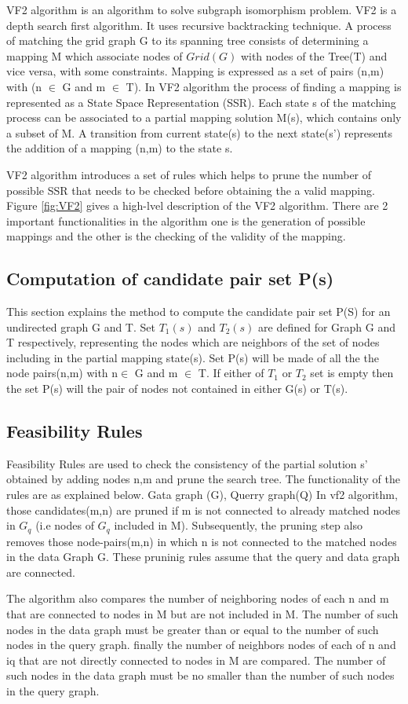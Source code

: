 VF2 algorithm is an algorithm to solve subgraph isomorphism problem. VF2 is a depth search first algorithm. It uses recursive backtracking technique. A process of matching 
the grid graph G to its spanning tree consists of determining a mapping M which associate nodes of $Grid(G)$ with nodes of the Tree(T) and vice versa, with some constraints.
Mapping is expressed as a set of pairs (n,m) with (n $\in$ G and m $\in$ T). 
In VF2 algorithm the process of finding a mapping is represented as a State Space Representation (SSR). Each state s of the matching process can be associated to a partial mapping solution M(s),
which contains only a subset of M. A transition from current state(s) to the next state(s') represents the addition of a mapping (n,m) to the state s.

VF2 algorithm introduces a set of rules which helps to prune the number of possible SSR that needs to be checked before obtaining the a valid mapping. Figure \ref{fig:VF2} gives a high-lvel description of the VF2 algorithm.
There are 2 important functionalities in the algorithm one is the generation of possible mappings and the other is the checking of the validity of the mapping.

\subsection{Computation of candidate pair set P(s)}
This section explains the method to compute the candidate pair set P(S) for an undirected graph G and T. 
Set $T_1(s)$ and $T_2(s)$ are defined for Graph G and T respectively, representing the nodes which are neighbors of the set of nodes including in the partial mapping state(s).
Set P(s) will be made of all the the node pairs(n,m) with n$\in$ G and m $\in$ T. If either of $T_1$ or $T_2$ set is empty then the set P(s) will the pair of nodes not contained in either G(s) or T(s).
\subsection{Feasibility Rules}
Feasibility Rules are used to check the consistency of the partial solution s' obtained by adding nodes n,m and prune the search tree. The functionality of the rules are as explained below.
Gata graph (G), Querry graph(Q)
In vf2 algorithm, those candidates(m,n) are pruned if m is not connected to already matched nodes in $G_q$
(i.e nodes of $G_q$ included in M).
Subsequently, the pruning step also removes those node-pairs(m,n) in which n is not connected to the matched 
nodes in the data Graph G. These pruninig rules assume that the query and data graph are connected.

The algorithm also compares the number of neighboring nodes of each n and m that are connected to nodes in M but are not
included in M. The number of such nodes in the data graph must be greater than or equal to the number of such nodes in the query graph.
finally the number of neighbors nodes of each of n and iq that are not directly connected to nodes in M are compared. The number of 
such nodes in the data graph must be no smaller than the number of such nodes in the query graph.